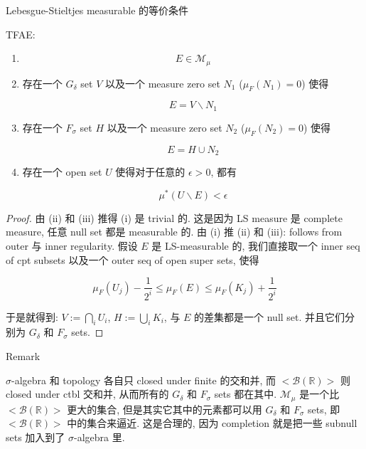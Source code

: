 \documentclass{qlnotes-export}
\begin{document}
\begin{theorem}{Lebesgue-Stieltjes measurable 的等价条件}\label{thm-03-distribution-function-lebesgue-stieltjes-measures-lebesgue-stieltjes-measurable}

TFAE:

\begin{enumerate}
\item
  \[E \in \mathcal{M}_{\mu}\]
\item
  存在一个 \(G_{\delta}\) set \(V\) 以及一个 measure zero set \(N_{1}\) (\(\mu_{F}(N_{1}) = 0\)) 使得

  \[E = V\backslash N_{1}\]
\item
  存在一个 \(F_{\sigma}\) set \(H\) 以及一个 measure zero set \(N_{2}\) (\(\mu_{F}(N_{2}) = 0\)) 使得

  \[E = H \cup N_{2}\]
\item
  存在一个 open set \(U\) 使得对于任意的 \(\epsilon > 0\), 都有

  \[\mu^{\ast}(U\backslash E) < \epsilon\]
\end{enumerate}

\end{theorem}

\begin{proof}

由 (ii) 和 (iii) 推得 (i) 是 trivial 的. 这是因为 LS measure 是 complete measure, 任意 null set 都是 measurable 的. 由 (i) 推 (ii) 和 (iii): follows from outer 与 inner regularity. 假设 \(E\) 是 LS-measurable 的, 我们直接取一个 inner seq of cpt subsets 以及一个 outer seq of open super sets, 使得

\[\mu_{F}(U_{j}) - \frac{1}{2^{i}} \leq \mu_{F}(E) \leq \mu_{F}(K_{j}) + \frac{1}{2^{i}}\]

于是就得到: \(V := \bigcap_{i}U_{i}\), \(H := \bigcup_{i}K_{i}\), 与 \(E\) 的差集都是一个 null set. 并且它们分别为 \(G_{\delta}\) 和 \(F_{\sigma}\) sets.

\end{proof}

\begin{qlremark}{Remark}

\(\sigma\)-algebra 和 topology 各自只 closed under finite 的交和并, 而 \(< \mathcal{B}({\mathbb{R}}) >\) 则 closed under ctbl 交和并, 从而所有的 \(G_{\delta}\) 和 \(F_{\sigma}\) sets 都在其中. \(\mathcal{M}_{\mu}\) 是一个比 \(< \mathcal{B}({\mathbb{R}}) >\) 更大的集合, 但是其实它其中的元素都可以用 \(G_{\delta}\) 和 \(F_{\sigma}\) sets, 即 \(< \mathcal{B}({\mathbb{R}}) >\) 中的集合来逼近. 这是合理的, 因为 completion 就是把一些 subnull sets 加入到了 \(\sigma\)-algebra 里.

\end{qlremark}
\end{document}

